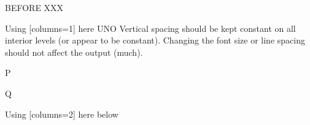 \documentclass[10pt]{article}
\begin{document}
BEFORE XXX
\begin{enumext}[save-ans=muaksss,columns=2,columns-sep=20pt,itemindent=0.5cm,listparindent=0.5cm,parsep=2\baselineskip]%

\item* Using [columns=1] here UNO
Vertical spacing should be kept constant on all interior levels (or
appear to be constant). Changing the font size or line spacing should
not affect the output (much).%


  \begin{enumext}[nosep]%
     \item* P \item Q%
  \end{enumext}

\item Using [columns=2] here below 







\end{enumext}
\end{document}
